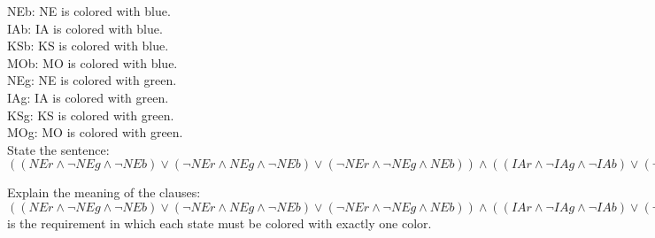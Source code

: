 \documentclass[a4paper]{article}
\begin{document}
NEb: NE is colored with blue.\\
IAb: IA is colored with blue.\\
KSb: KS is colored with blue.\\
MOb: MO is colored with blue.\\

NEg: NE is colored with green.\\
IAg: IA is colored with green.\\
KSg: KS is colored with green.\\
MOg: MO is colored with green.\\

State the sentence:\\
$((NEr \wedge \neg NEg \wedge \neg NEb) \vee (\neg NEr \wedge NEg \wedge \neg NEb) \vee (\neg NEr \wedge \neg NEg \wedge NEb))\wedge ((IAr \wedge \neg IAg \wedge \neg IAb) \vee (\neg IAr \wedge IAg \wedge \neg IAb) \vee (\neg IAr \wedge \neg IAg \wedge IAb))\wedge ((KSr \wedge \neg KSg \wedge \neg KSb) \vee (\neg KSr \wedge KSg \wedge \neg KSb) \vee (\neg KSr \wedge \neg KSg \wedge KSb))\wedge ((MOr \wedge \neg MOg \wedge \neg MOb) \vee (\neg MOr \wedge MOg \wedge \neg MOb) \vee (\neg MOr \wedge \neg MOg \wedge MOb)) \wedge (((NEr \rightarrow (\neg IAr \wedge \neg KSr))\wedge (IAr \rightarrow (\neg NEr \wedge \neg MOr))\wedge (KSr \rightarrow (\neg NEr \wedge \neg MOr))\wedge (MOr \rightarrow (\neg NEr \wedge \neg IAr \wedge \neg KSr))))\wedge (((NEg \rightarrow (\neg IAg \wedge \neg KSg))\wedge (IAg \rightarrow (\neg NEg \wedge \neg MOg))\wedge (KSg \rightarrow (\neg NEg \wedge \neg MOg))\wedge (MOg \rightarrow (\neg NEg \wedge \neg IAg \wedge \neg KSg))))\wedge (((NEb \rightarrow (\neg IAb \wedge \neg KSb))\wedge (IAb \rightarrow (\neg NEb \wedge \neg MOb))\wedge (KSb \rightarrow (\neg NEb \wedge \neg MOb))\wedge (MOb \rightarrow (\neg NEb \wedge \neg IAb \wedge \neg KSb))))$

Explain the meaning of the clauses:\\
$((NEr \wedge \neg NEg \wedge \neg NEb) \vee (\neg NEr \wedge NEg \wedge \neg NEb) \vee (\neg NEr \wedge \neg NEg \wedge NEb))\wedge ((IAr \wedge \neg IAg \wedge \neg IAb) \vee (\neg IAr \wedge IAg \wedge \neg IAb) \vee (\neg IAr \wedge \neg IAg \wedge IAb))\wedge ((KSr \wedge \neg KSg \wedge \neg KSb) \vee (\neg KSr \wedge KSg \wedge \neg KSb) \vee (\neg KSr \wedge \neg KSg \wedge KSb))\wedge ((MOr \wedge \neg MOg \wedge \neg MOb) \vee (\neg MOr \wedge MOg \wedge \neg MOb) \vee (\neg MOr \wedge \neg MOg \wedge MOb))$ is the requirement in which each state must be colored with exactly one color.\\
\end{document}
